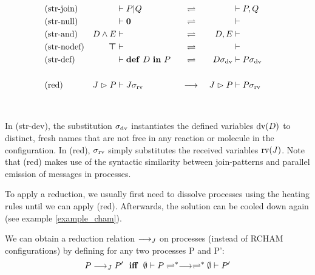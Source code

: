\begin{align*}
  \rchamequ{str-join}{
    \rchamcnf*{}{P \jpar Q}
  }{
    \rchamcnf*{}{P, Q}
  }
  \\
  \rchamequ{str-null}{
    \rchamcnf*{}{\jnullproc}
  }{
    \rchamcnf*{}{}
  }
  \\
  \rchamequ{str-and}{
    \rchamcnf*{D \jcon E}{}
  }{
    \rchamcnf*{D, E}{}
  }
  \\
  \rchamequ{str-nodef}{
    \rchamcnf*{\jnulldef}{}
  }{
    \rchamcnf*{}{}
  }
  \\
  \rchamequ{str-def}{
    \rchamcnf*{}{\jdef{D}{P}}
  }{
    \rchamcnf*{D\sigma_{\opdv}}{P\sigma_{\opdv}}
  }
  \\
  \\
  \rchamred{red}{
    \rchamcnf*{\jrct{J}{P}}{J\sigma_{\oprv}}
  }{
    \rchamcnf*{\jrct{J}{P}}{P\sigma_{\oprv}}
  }
\end{align*}
\\
\\
In (str-dev), the substitution $\sigma_{\operatorname{dv}}$ instantiates the defined
variables $\operatorname{dv}(D)$ to distinct, fresh names that are not free in any reaction
or molecule in the configuration.
In (red), $\sigma_{\operatorname{rv}}$ simply substitutes the received variables $\operatorname{rv}(J)$.
Note that (red) makes use of the syntactic similarity between join-patterns
and parallel emission of messages in processes.

To apply a reduction, we usually first need to dissolve processes
using the heating rules until we can apply (red).
Afterwards, the solution can be cooled down again
(see example \ref{example_cham}).

We can obtain a reduction relation $\longrightarrow_J$
on processes (instead of RCHAM configurations)
by defining for any two processes P and P':
\begin{equation*}
  P \joinreduction P'
  \ \ \textbf{iff} \ \ 
  \rchamcnf{\emptyset}{P}
  \rchamheating^*\rchamreduction\rchamheating^*
  \rchamcnf{\emptyset}{P'}
\end{equation*}

